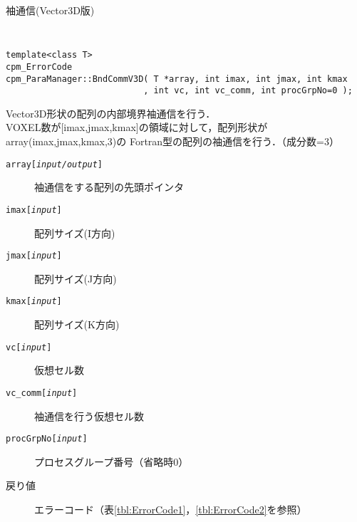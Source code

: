 \begin{spacing}{0.8}
\begin{itembox}[l]{袖通信(Vector3D版)}
{\tt
\begin{verbatim}
template<class T>
cpm_ErrorCode
cpm_ParaManager::BndCommV3D( T *array, int imax, int jmax, int kmax
                           , int vc, int vc_comm, int procGrpNo=0 );
\end{verbatim}
}
Vector3D形状の配列の内部境界袖通信を行う．\\
VOXEL数が[imax,jmax,kmax]の領域に対して，配列形状がarray(imax,jmax,kmax,3)の
Fortran型の配列の袖通信を行う．（成分数=3）
\begin{description}
\item[{\tt array[{\it input/output}]}] 袖通信をする配列の先頭ポインタ
\item[{\tt imax[{\it input}]}] 配列サイズ(I方向)
\item[{\tt jmax[{\it input}]}] 配列サイズ(J方向)
\item[{\tt kmax[{\it input}]}] 配列サイズ(K方向)
\item[{\tt vc[{\it input}]}] 仮想セル数
\item[{\tt vc\_comm[{\it input}]}] 袖通信を行う仮想セル数
\item[{\tt procGrpNo[{\it input}]}] プロセスグループ番号（省略時0）
\\
\item[戻り値] エラーコード（表\ref{tbl:ErrorCode1}，\ref{tbl:ErrorCode2}を参照）
\end{description}
\end{itembox}\\
\end{spacing}


